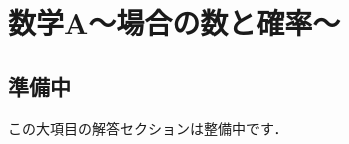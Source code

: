 \documentclass[../../../ms_a.tex]{subfiles}
\begin{document}
\section{数学A～場合の数と確率～}

\subsection*{準備中}
この大項目の解答セクションは整備中です．
\end{document}
